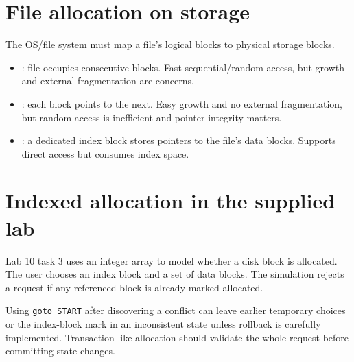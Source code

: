 \section{File allocation on storage}
The OS/file system must map a file's logical blocks to physical storage blocks.
\begin{itemize}
  \item {}: file occupies consecutive blocks. Fast sequential/random access, but growth and external fragmentation are concerns.
  \item {}: each block points to the next. Easy growth and no external fragmentation, but random access is inefficient and pointer integrity matters.
  \item {}: a dedicated index block stores pointers to the file's data blocks. Supports direct access but consumes index space.
\end{itemize}

\section{Indexed allocation in the supplied lab}
Lab 10 task 3 uses an integer array to model whether a disk block is allocated. The user chooses an index block and a set of data blocks. The simulation rejects a request if any referenced block is already marked allocated.

\begin{mlfigure}
\end{mlfigure}

\begin{pitfall}
Using \texttt{goto START} after discovering a conflict can leave earlier temporary choices or the index-block mark in an inconsistent state unless rollback is carefully implemented. Transaction-like allocation should validate the whole request before committing state changes.
\end{pitfall}

